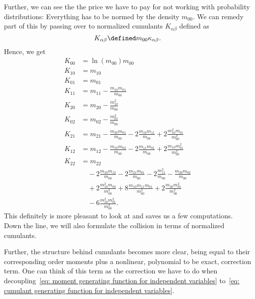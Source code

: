 Further, we can see the the price we have to pay for not working with probability distributions: Everything has to be normed by the density $m_{00}$.
We can remedy part of this by passing over to normalized cumulants $K_{\alpha\beta}$ defined as
\begin{equation}
  \label{eq: definition normalized cumulants}
  K_{\alpha\beta} \defined m_{00}\kappa_{\alpha\beta}.
\end{equation}
Hence, we get
\begin{align}
  K_{00} & = \ln(m_{00})m_{00} \label{eq: K 00 from moments}\\
  K_{10} & = m_{10} \label{eq: K 10 from moments}\\
  K_{01} & = m_{01} \label{eq: K 01 from moments}\\
  K_{11} & = m_{11} - \frac{m_{10}m_{01}}{m_{00}} \label{eq: K 11 from moments} \\
  K_{20} & = m_{20} - \frac{m_{10}^2}{m_{00}} \label{eq: K 20 from moments}\\
  K_{02} & = m_{02} - \frac{m_{01}^2}{m_{00}} \label{eq: K 02 from moments}\\
  K_{21} & = m_{21} - \frac{m_{20}m_{01}}{m_{00}}
       - 2\frac{m_{10}m_{11}}{m_{00}} + 2\frac{m_{10}^2 m_{01}}{m_{00}^2} \label{eq: K 21 from moments}\\
  K_{12} & = m_{12} - \frac{m_{10}m_{02}}{m_{00}}
       - 2\frac{m_{11}m_{01}}{m_{00}} + 2\frac{m_{10} m_{01}^2}{m_{00}^2} \label{eq: K 12 from moments}\\
  K_{22} & = m_{22} \nonumber \\
       & \quad - 2 \frac{m_{10}m_{12}}{m_{00}} - 2\frac{m_{21}m_{01}}{m_{00}}
        - 2 \frac{m_{11}^2}{m_{00}} - \frac{m_{20}m_{02}}{m_{00}}\nonumber \\
       & \quad + 2 \frac{m_{10}^2 m_{02}}{m_{00}^2} + 8 \frac{m_{10}m_{11}m_{01}}{m_{00}^2}
        + 2 \frac{m_{20}m_{01}^2}{m_{00}^2} \nonumber \\
       & \quad - 6 \frac{m_{10}^2 m_{01}^2}{m_{00}^3}\label{eq: K 22 from moments}.
\end{align}
This definitely is more pleasant to look at and saves us a few computations.
Down the line, we will also formulate the collision in terms of normalized cumulants.

Further, the structure behind cumulants becomes more clear, being equal to their corresponding order moments plus a nonlinear, polynomial to be exact, correction term.
One can think of this term as the correction we have to do when decoupling~\eqref{eq: moment generating function for independent variables}
to~\eqref{eq: cumulant generating function for independent variables}.

